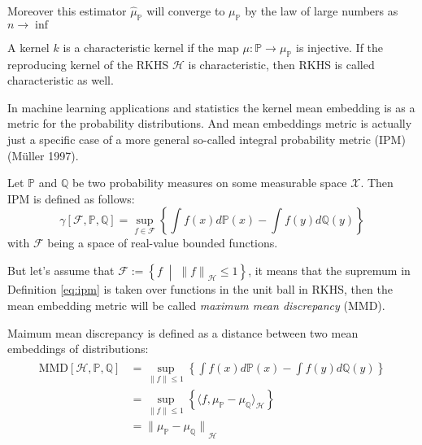 Moreover this estimator $\hat{\mu}_{\mathds{P}}$  will converge to $\mu_{\mathds{P}}$ by the law of large numbers as $n \rightarrow \inf$

\begin{definition}
    A kernel $k$ is a characteristic kernel if the map $\mu: \mathds{P} \rightarrow \mu_{\mathds{P}}$ is injective. If the reproducing kernel of the RKHS $\mathscr{H}$ is characteristic, then RKHS is called characteristic as well. 
\end{definition}

In machine learning applications and statistics the kernel mean embedding is as a metric for the probability distributions. And mean embeddings metric is actually just a specific case of a more general so-called integral probability metric (IPM) (Müller 1997). 

\begin{definition}[IPM]
    Let $\mathds{P}$ and  $\mathds{Q}$ be two probability measures on some measurable space $\mathcal{X}$. Then IPM is defined as follows:
    \begin{equation}
        \gamma [\mathcal{F}, \mathds{P}, \mathds{Q}] = \sup_{f\in \mathcal{F}} \left\{ \int f(x) d\mathds{P}(x) -  \int f(y) d\mathds{Q}(y) \right\}
    \end{equation}
    with $\mathcal{F}$ being a space of real-value bounded functions.
    \label{eq:ipm}
\end{definition}

But let's assume that $\mathcal{F} := \left\{f \;\middle| \;{\lVert f \rVert}_{\mathscr{H}} \leq 1\right\}$, it means that the supremum in Definition \ref{eq:ipm} is taken over functions in the unit ball in RKHS, then the mean embedding metric will be called \textit{maximum mean discrepancy} (MMD). 

\begin{definition}[IPM]
    Maimum mean discrepancy is defined as a distance between two mean embeddings of distributions:
    \begin{align}
        \begin{split}
            \textrm{MMD} [\mathscr{H}, \mathds{P}, \mathds{Q}] & = \sup_{ \lVert f \rVert \leq 1} \left\{ \int f(x) d\mathds{P}(x) -  \int f(y) d\mathds{Q}(y) \right\} \\ 
            & = \sup_{ \lVert f \rVert \leq 1} \left\{ \langle f, \mu_{\mathds{P}} - \mu_{\mathds{Q}} \rangle_{\mathscr{H}} \right\} \\
            & = {\lVert \mu_{\mathds{P}} - \mu_{\mathds{Q}} \rVert }_{\mathscr{H}}
        \end{split}
    \end{align}
    \label{eq:mmd}
\end{definition}


